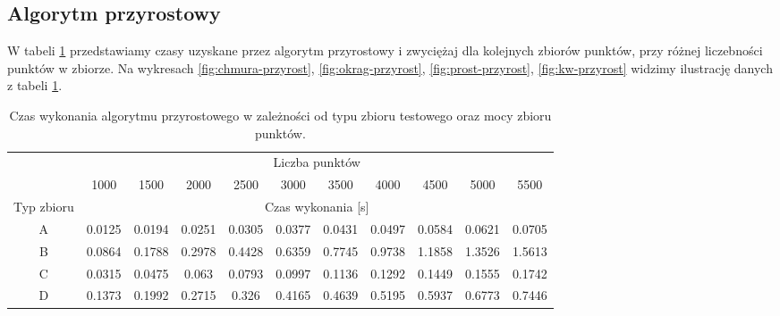\documentclass[11pt]{article}
\theoremstyle{remark} \newtheorem{definition}{def.}
\theoremstyle{definition} \newtheorem{twierdzenie}{tw.}
\begin{document}
\subsection{Algorytm przyrostowy}


W tabeli \ref{tab:przyrost} przedstawiamy czasy uzyskane przez algorytm przyrostowy i zwyciężaj dla kolejnych zbiorów punktów, przy różnej liczebności punktów w zbiorze. Na wykresach \ref{fig:chmura-przyrost}, 
\ref{fig:okrag-przyrost}, \ref{fig:prost-przyrost}, \ref{fig:kw-przyrost} widzimy ilustrację danych z tabeli \ref{tab:przyrost}.

\begin{table}[]
\centering
\caption{Czas wykonania algorytmu przyrostowego w zależności od typu zbioru testowego oraz mocy zbioru punktów.}
\label{tab:przyrost}
\begin{tabular}{c|c|c|c|c|c|c|c|c|c|c|}
\cline{2-11}
\multicolumn{1}{l|}{} & \multicolumn{10}{c|}{Liczba punktów} \\ \cline{2-11} 
\multicolumn{1}{l|}{} & 1000 & 1500 & 2000 & 2500 & 3000 & 3500 & 4000 & 4500 & 5000 & 5500 \\ \hline
\multicolumn{1}{|c|}{Typ zbioru} & \multicolumn{10}{c|}{Czas wykonania {[}s{]}} \\ \hline
\multicolumn{1}{|c|}{A} & 0.0125 & 0.0194 & 0.0251 & 0.0305 & 0.0377 & 0.0431 & 0.0497 & 0.0584 & 0.0621 & 0.0705 \\ \hline
\multicolumn{1}{|c|}{B} & 0.0864 & 0.1788 & 0.2978 & 0.4428 & 0.6359 & 0.7745 & 0.9738 & 1.1858 & 1.3526 & 1.5613 \\ \hline
\multicolumn{1}{|c|}{C} & 0.0315 & 0.0475 & 0.063 & 0.0793 & 0.0997 & 0.1136 & 0.1292 & 0.1449 & 0.1555 & 0.1742 \\ \hline
\multicolumn{1}{|c|}{D} & 0.1373 & 0.1992 & 0.2715 & 0.326 & 0.4165 & 0.4639 & 0.5195 & 0.5937 & 0.6773 & 0.7446 \\ \hline
\end{tabular}
\end{table}
\end{document}
